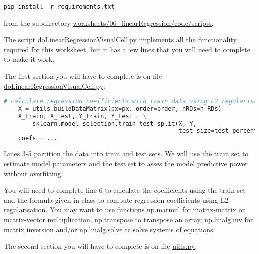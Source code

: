\documentclass[12pt]{article}
\begin{document}
\texttt{pip install -r requirements.txt}

\noindent from the subdirectory
\href{https://github.com/joacorapela/neuroinformatics24/blob/master/worksheets/06_linearRegression/code/scripts}{worksheets/06\_linearRegression/code/scripts}.

The script
\href{https://github.com/joacorapela/neuroinformatics24/blob/master/worksheets/06_linearRegression/code/scripts/doLinearRegressionVisualCell.py}{doLinearRegressionVisualCell.py}
implements all the functionality required for this worksheet, but it has a few
lines that you will need to complete to make it work.

The first section you will have to complete is on file
\href{https://github.com/joacorapela/neuroinformatics24/blob/master/worksheets/06_linearRegression/code/scripts/https://github.com/joacorapela/neuroinformatics24/blob/master/worksheets/06_linearRegression/code/scripts/doLinearRegressionVisualCell.py}{doLinearRegressionVisualCell.py}:

\begin{lstlisting}[language=python]
    # calculate regression coefficients with train data using L2 regularisation
    X = utils.buildDataMatrix(px=px, order=order, nRDs=n_RDs)
    X_train, X_test, Y_train, Y_test = \
        sklearn.model_selection.train_test_split(X, Y,
                                                 test_size=test_percentage)
    coefs = ...
\end{lstlisting}

Lines 3-5 partition the data into train and test sets. We will use the train
set to estimate model parameters and the test set to asses the model predictive
power without overfitting.

You will need to complete line 6 to calculate the coefficients using the train
set and the formula given in class to compute regression coefficients using
L2 regularisation. You may want to use functions
\href{https://numpy.org/doc/stable/reference/generated/numpy.matmul.html}{np.matmul} for
matrix-matrix or matrix-vector multiplication,
\href{https://numpy.org/doc/stable/reference/generated/numpy.transpose.html}{np.transpose}
to transpose an array,
\href{https://numpy.org/doc/stable/reference/generated/numpy.linalg.inv.html}{np.linalg.inv}
for matrix inversion and/or
\href{https://numpy.org/doc/stable/reference/generated/numpy.linalg.solve.html}{np.linalg.solve}
to solve systems of equations.

The second section you will have to complete is on file
\href{https://github.com/joacorapela/neuroinformatics24/blob/master/worksheets/06_linearRegression/code/scripts/utils.py}{utils.py}:
\end{document}
